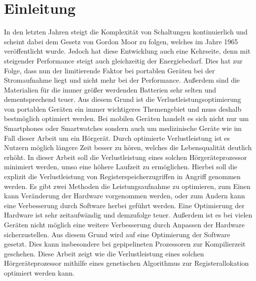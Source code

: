 
\thispagestyle{empty}
%
\chapter{Einleitung}
\label{chap:introduction}
In den letzten Jahren steigt die Komplexität von Schaltungen kontinuierlich und scheint dabei dem Gesetz von Gordon Moor zu folgen, welches im Jahre 1965 veröffentlicht wurde. Jedoch hat diese Entwicklung auch eine Kehrseite, denn mit steigender Performance steigt auch gleichzeitig der Energiebedarf. Dies hat zur Folge, dass nun der limitierende Faktor bei portablen Geräten bei der Stromaufnahme liegt und nicht mehr bei der Performance. Außerdem sind die Materialien für die immer größer werdenden Batterien sehr selten und dementsprechend teuer. Aus diesem Grund ist die Verlustleistungsoptimierung von portablen Geräten ein immer wichtigeres Themengebiet und muss deshalb bestmöglich optimiert werden. Bei mobilen Geräten handelt es sich nicht nur um Smartphones oder Smartwatches sondern auch um medizinische Geräte wie im Fall dieser Arbeit um ein Hörgerät. Durch optimierte Verlustleistung ist es Nutzern möglich längere Zeit besser zu hören, welches die Lebensqualität deutlich erhöht.
In dieser Arbeit soll die Verlustleistung eines solchen Hörgeräteprozessor minimiert werden, umso eine höhere Laufzeit zu ermöglichen. Hierbei soll die explizit die Verlustleistung von Registerspeicherzugriffen in Angriff genommen werden. 
Es gibt zwei Methoden die Leistungsaufnahme zu optimieren, zum Einen kann Veränderung der Hardware vorgenommen werden, oder zum Andern kann eine Verbesserung durch Software herbei geführt werden. Eine Optimierung der Hardware ist sehr zeitaufwändig und demzufolge teuer. Außerdem ist es bei vielen Geräten nicht möglich eine weitere Verbesserung durch Anpassen der Hardware sicherzustellen. Aus diesem Grund wird auf eine Optimierung der Software gesetzt. Dies kann insbesondere bei gepipelineten Prozessoren zur Kompilierzeit geschehen. 
Diese Arbeit zeigt wie die Verlustleistung eines solchen Hörgeräteprozessor mithilfe eines genetischen Algorithmus zur Registerallokation optimiert werden kann.

